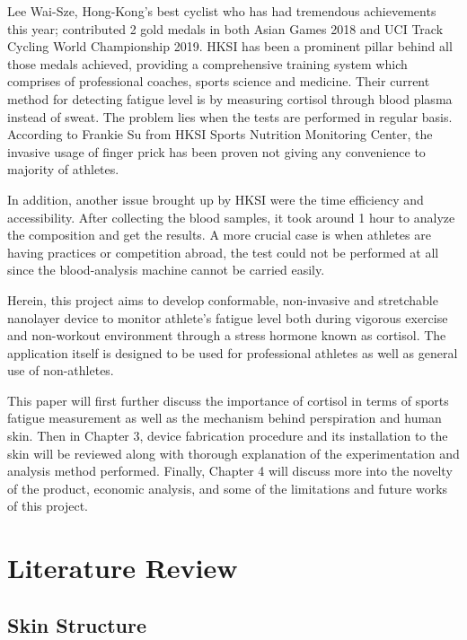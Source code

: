\documentclass[journal]{IEEEtran}
\begin{document}
Lee Wai-Sze, Hong-Kong’s best cyclist who has had tremendous achievements this year; contributed 2 gold medals in both Asian Games 2018 and UCI Track Cycling World Championship 2019. HKSI has been a prominent pillar behind all those medals achieved, providing a comprehensive training system which comprises of professional coaches, sports science and medicine. Their current method for detecting  fatigue  level  is  by measuring cortisol through blood plasma instead of sweat. The problem lies when the tests are performed in regular basis. According to Frankie Su from HKSI Sports Nutrition Monitoring Center, the invasive usage of finger prick has been proven not giving any convenience to majority of athletes. 

In addition, another issue brought up by HKSI were the time efficiency and accessibility. After collecting the blood samples, it took around 1 hour to analyze the composition and get the results. A more crucial case is when athletes are having practices or competition abroad, the test could not be performed at all since the blood-analysis machine cannot be carried easily. 

Herein, this project aims to develop conformable, non-invasive and stretchable nanolayer device to monitor athlete’s fatigue level both during vigorous exercise and non-workout environment through a stress hormone known as cortisol. The application itself is designed to be used for professional athletes as well as general use of non-athletes.

This paper will first further discuss the importance of cortisol in terms of sports fatigue measurement as well as the mechanism behind perspiration and human skin. Then in Chapter 3, device fabrication procedure and its installation to the skin will be reviewed along with thorough explanation of the experimentation and analysis method performed. Finally, Chapter 4 will discuss more into the novelty of the product, economic analysis, and some of the limitations and future works of this project.

\section{Literature Review}
\subsection{Skin Structure}
\end{document}
